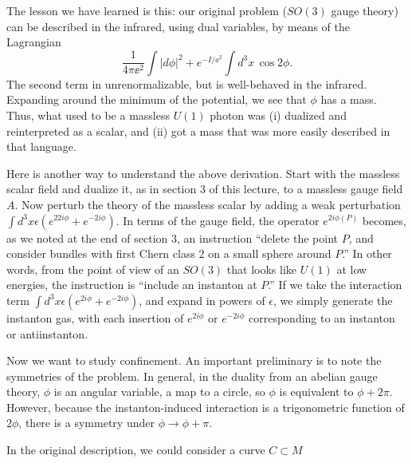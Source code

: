 \bigskip\bigskip

The lesson we have learned is this: our original problem ($SO(3)$ gauge theory)
can be described in the infrared, using dual variables, by means of the
Lagrangian
\begin{equation}
\frac1{4\pi\ee^2}\int|d\phi|^2+e^{-I/\ee^2}\int d^3x\,\cos 2\phi.
\end{equation}
The second term in unrenormalizable, but is well-behaved in the infrared.
Expanding around the minimum of the potential, we see that $\phi$ has
a mass.  Thus, what used to be a massless $U(1)$ photon was
(i) dualized and reinterpreted as a scalar, and (ii) got a mass
that was more easily described in that language.

Here is another way to understand the above derivation.  Start
with the massless scalar field and dualize it, as in section 3
of this lecture, to a massless gauge field $A$.  Now perturb the
theory of the massless scalar by adding a weak perturbation
$\int d^3x \epsilon(e^{22i\phi}+e^{-2i\phi})$.  In terms of the gauge
field, the operator $e^{2i\phi(P)}$ becomes, as we noted at the end of
section 3, an instruction ``delete the point $P$, and consider bundles
with  first Chern class 2 on a small sphere around $P$.''  In other words,
from the point of view of an $SO(3)$ that looks like $U(1)$ at low energies,
the instruction is ``include an instanton at $P$.''
If we take the interaction term $\int d^3x \epsilon(e^{2i\phi}+e^{-2i\phi})$,
and expand in powers of $\epsilon$, we simply generate the instanton
gas, with each insertion of $e^{2i\phi}$ or $e^{-2i\phi}$ corresponding
to an instanton or antiinstanton.

Now we want to study confinement.
An important preliminary is to note the symmetries of the problem.
In general, in the duality from an abelian gauge theory, $\phi$
is an angular variable, a map to a circle, so $\phi$ is equivalent to
$\phi+2\pi$.  However, because the instanton-induced interaction is
a trigonometric function of $2\phi$, there is a symmetry under $\phi\to
\phi+\pi$.


In the original description, we could
consider a curve $C\subset M$

\epsfxsize=1.5in
\centerline{}

